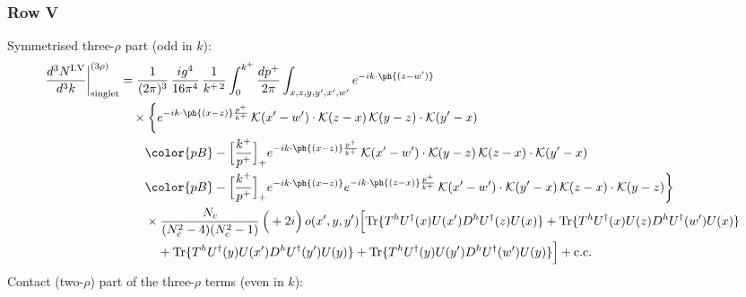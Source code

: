 \subsubsection*{Row V}
Symmetrised three-$\rho$ part (odd in $k$):
\begin{align}
\frac{d^{3}N^{\rm I.V}}{d^{3}k}\bigg|^{(3\rho)}_{\rm singlet}&=\frac{1}{(2\pi)^{3}}\,\frac{ig^{4}}{16\pi^{4}}\,\frac{1}{k^{+\,2}}\int_{0}^{k^{+}}\frac{dp^{+}}{2\pi}\int_{x,z,y,y',x',w'}e^{-ik\cdot\ph{(z-w')}}\notag\\
&\quad\times\bigg\{e^{-ik\cdot\ph{(x-z)}\frac{p^{+}}{k^{+}}}\,\mathcal{K}(x'-w')\cdot\mathcal{K}(z-x)\,\mathcal{K}(y-z)\cdot\mathcal{K}(y'-x)\notag\\
&\qquad{\color{pB}-\Big[\frac{k^{+}}{p^{+}}\Big]_{+}e^{-ik\cdot\ph{(x-z)}\frac{p^{+}}{k^{+}}}\,\mathcal{K}(x'-w')\cdot\mathcal{K}(y-z)\,\mathcal{K}(z-x)\cdot\mathcal{K}(y'-x)}\notag\\
&\qquad{\color{pB}-\Big[\frac{k^{+}}{p^{+}}\Big]_{+}e^{-ik\cdot\ph{(x-z)}}e^{-ik\cdot\ph{(z-x)}\frac{p^{+}}{k^{+}}}\,\mathcal{K}(x'-w')\cdot\mathcal{K}(y'-x)\,\mathcal{K}(z-x)\cdot\mathcal{K}(y-z)}\bigg\}\notag\\
&\qquad\times \frac{N_{c}}{(N_{c}^{2}-4)(N_{c}^{2}-1)}\,\Big(+2i\Big)\,o(x',y,y')\Big[{\rm Tr}\{T^{h}U^{\dagger}(x)U(x')D^{h}U^{\dagger}(z)U(x)\}+{\rm Tr}\{T^{h}U^{\dagger}(x)U(z)D^{h}U^{\dagger}(w')U(x)\}\notag\\
&\qquad\quad +{\rm Tr}\{T^{h}U^{\dagger}(y)U(x')D^{h}U^{\dagger}(y')U(y)\}+{\rm Tr}\{T^{h}U^{\dagger}(y)U(y')D^{h}U^{\dagger}(w')U(y)\}\Big]+{\rm c.c.}\label{eq:E-I.V-3}
\end{align}
Contact (two-$\rho$) part of the three-$\rho$ terms (even in $k$):
